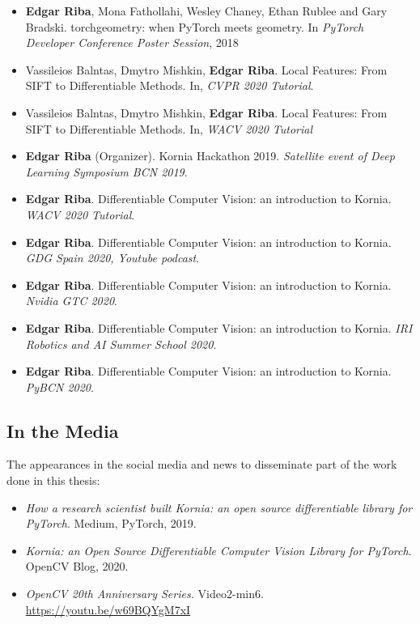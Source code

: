 \begin{itemize}
\item \textbf{Edgar Riba}, Mona Fathollahi, Wesley Chaney, Ethan Rublee and Gary Bradski. torchgeometry: when PyTorch meets geometry. In \textit{PyTorch Developer Conference Poster Session}, 2018
\item Vassileios Balntas, Dmytro Mishkin, \textbf{Edgar Riba}. Local Features: From SIFT to Differentiable Methods. In, \textit{CVPR 2020 Tutorial}.
\item Vassileios Balntas, Dmytro Mishkin, \textbf{Edgar Riba}. Local Features: From SIFT to Differentiable Methods. In, \textit{WACV 2020 Tutorial}
\item  \textbf{Edgar Riba} (Organizer). Kornia Hackathon 2019. \textit{Satellite event of Deep Learning Symposium BCN 2019}.
\item \textbf{Edgar Riba}. Differentiable Computer Vision: an introduction to Kornia. \textit{WACV 2020 Tutorial}.
\item \textbf{Edgar Riba}. Differentiable Computer Vision: an introduction to Kornia. \textit{GDG Spain 2020, Youtube podcast}.
\item \textbf{Edgar Riba}. Differentiable Computer Vision: an introduction to Kornia. \textit{Nvidia GTC 2020}.
\item \textbf{Edgar Riba}. Differentiable Computer Vision: an introduction to Kornia. \textit{IRI Robotics and AI Summer School 2020}.
\item \textbf{Edgar Riba}. Differentiable Computer Vision: an introduction to Kornia. \textit{PyBCN 2020}.
\end{itemize}

\subsection{In the Media}

The appearances in the social media and news to disseminate part of the work done in this thesis:

\begin{itemize}
\item \textit{How a research scientist built Kornia: an open source differentiable library for PyTorch}. Medium, PyTorch, 2019.
\item \textit{Kornia: an Open Source Differentiable Computer Vision Library for PyTorch}. OpenCV Blog, 2020.
\item \textit{OpenCV 20th Anniversary Series.} Video2-min6. \url{https://youtu.be/w69BQYgM7xI}
\end{itemize}

